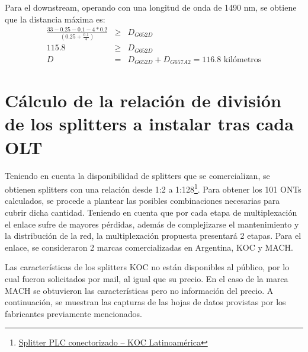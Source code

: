 \documentclass[11pt,a4paper]{article}
\begin{document}
  
  Para el downstream, operando con una longitud de onda de 1490 nm, se obtiene que la distancia máxima es:
  \begin{eqnarray*}
    \frac{33-0.25-0.1-4*0.2}{\left(0.25+\frac{0.1}{4}\right)}&\geq& D_{G652D} \\
    115.8 &\geq& D_{G652D} \\
    D&=&D_{G652D}+D_{G657A2}=116.8 \text{ kilómetros}
  \end{eqnarray*}


  \section{Cálculo de la relación de división de los splitters a instalar tras cada OLT}
  \label{section:calc_rel_div_spl}

  Teniendo en cuenta la disponibilidad de splitters que se comercializan, se obtienen splitters con una relación desde 1:2 a 1:128\footnote{\href{https://www.koc.com.ar/productos-redes-de-fibra-optica/splitter-plc-plc-1xn/}{Splitter PLC conectorizado -- KOC Latinoamérica}}. 
  Para obtener los 101 ONTs calculados, se procede a plantear las posibles combinaciones necesarias para cubrir dicha cantidad. 
  Teniendo en cuenta que por cada etapa de multiplexación el enlace sufre de mayores pérdidas, además de complejizarse el mantenimiento y la distribución de la red, la multiplexación propuesta presentará 2 etapas. 
  Para el enlace, se consideraron 2 marcas comercializadas en Argentina, KOC y MACH. 
  
  Las características de los splitters KOC no están disponibles al público, por lo cual fueron solicitados por mail, al igual que su precio. 
  En el caso de la marca MACH se obtuvieron las características pero no información del precio. 
  A continuación, se muestran las capturas de las hojas de datos provistas por los fabricantes previamente mencionados. 
\end{document}
